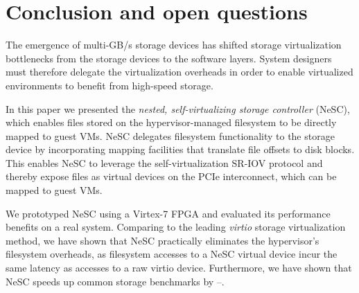 
\chapter{Conclusion and open questions}
\label{chap:conclusion}


The emergence of multi-GB/s storage devices has shifted storage virtualization bottlenecks from the storage devices to the software layers. System designers must therefore delegate the virtualization overheads in order to enable virtualized environments to benefit from high-speed storage. 

In this paper we presented the \emph{nested, self-virtualizing storage controller} (NeSC), which enables files stored on the hypervisor-managed filesystem to be directly mapped to guest VMs. NeSC delegates filesystem functionality to the storage device by incorporating mapping facilities that translate file offsets to disk blocks. This enables NeSC to leverage the self-virtualization SR-IOV protocol and thereby expose files as virtual devices on the PCIe interconnect, which can be mapped to guest VMs.

We prototyped NeSC using a Virtex-7 FPGA and evaluated its performance benefits on a real system. Comparing to the leading \emph{virtio} storage virtualization method, we have shown that NeSC practically eliminates the hypervisor's filesystem overheads, as filesystem accesses to a NeSC virtual device incur the same latency as accesses to a raw virtio device.
Furthermore, we have shown that NeSC speeds up common storage benchmarks by --.
